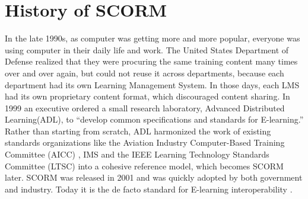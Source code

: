 \section{History of SCORM}
In the late 1990s, as computer was getting more and more popular, everyone was using computer in their daily life and work. The United States 
Department of Defense realized that they were procuring the same training content many times over and over again, but could not reuse it across 
departments, because each department had its own Learning Management System. In those days, each LMS had its own proprietary content format, which 
discouraged content sharing. In 1999 an executive ordered a small research laboratory, Advanced Distributed Learning(ADL), to ``develop common 
specifications and standards for E-learning.'' Rather than starting from scratch, ADL harmonized the work of existing standards organizations like 
the Aviation Industry Computer-Based Training Committee (AICC) \cite{aicc}, IMS \cite{ims} and the IEEE Learning Technology Standards Committee 
(LTSC) \cite{ltsc} into a cohesive reference model, which becomes SCORM later. SCORM was released in 2001 and was quickly adopted by both government 
and industry. Today it is the de facto standard for E-learning interoperability \cite{history_of_scorm}.
